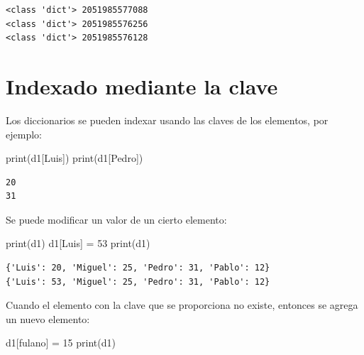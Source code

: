 \documentclass[
  spanish,
  letterpaper,
]{scrbook}
\newenvironment{Shaded}{\begin{snugshade}}{\end{snugshade}}
\newcommand{\BuiltInTok}[1]{\textcolor[rgb]{0.00,0.23,0.31}{#1}}
\newcommand{\DecValTok}[1]{\textcolor[rgb]{0.68,0.00,0.00}{#1}}
\newcommand{\NormalTok}[1]{\textcolor[rgb]{0.00,0.23,0.31}{#1}}
\newcommand{\OperatorTok}[1]{\textcolor[rgb]{0.37,0.37,0.37}{#1}}
\newcommand{\StringTok}[1]{\textcolor[rgb]{0.13,0.47,0.30}{#1}}
\theoremstyle{definition}
\theoremstyle{remark}
\begin{document}
\begin{verbatim}
<class 'dict'> 2051985577088
<class 'dict'> 2051985576256
<class 'dict'> 2051985576128
\end{verbatim}

\section{Indexado mediante la clave}\label{indexado-mediante-la-clave}

Los diccionarios se pueden indexar usando las claves de los elementos,
por ejemplo:

\begin{Shaded}
\begin{Highlighting}[]
\BuiltInTok{print}\NormalTok{(d1[}\StringTok{\textquotesingle{}Luis\textquotesingle{}}\NormalTok{])}
\BuiltInTok{print}\NormalTok{(d1[}\StringTok{\textquotesingle{}Pedro\textquotesingle{}}\NormalTok{])}
\end{Highlighting}
\end{Shaded}

\begin{verbatim}
20
31
\end{verbatim}

Se puede modificar un valor de un cierto elemento:

\begin{Shaded}
\begin{Highlighting}[]
\BuiltInTok{print}\NormalTok{(d1)}
\NormalTok{d1[}\StringTok{\textquotesingle{}Luis\textquotesingle{}}\NormalTok{] }\OperatorTok{=} \DecValTok{53}
\BuiltInTok{print}\NormalTok{(d1)}
\end{Highlighting}
\end{Shaded}

\begin{verbatim}
{'Luis': 20, 'Miguel': 25, 'Pedro': 31, 'Pablo': 12}
{'Luis': 53, 'Miguel': 25, 'Pedro': 31, 'Pablo': 12}
\end{verbatim}

Cuando el elemento con la clave que se proporciona no existe, entonces
se agrega un nuevo elemento:

\begin{Shaded}
\begin{Highlighting}[]
\NormalTok{d1[}\StringTok{\textquotesingle{}fulano\textquotesingle{}}\NormalTok{] }\OperatorTok{=} \DecValTok{15}
\BuiltInTok{print}\NormalTok{(d1)}
\end{Highlighting}
\end{Shaded}
\end{document}

